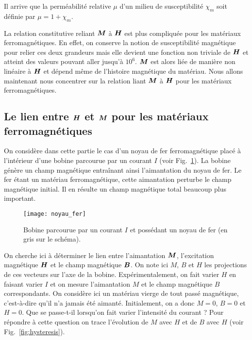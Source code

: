 \begin{rema}
	Il arrive que la perméabilité relative $\mu$ d'un milieu de susceptibilité
	$\chi_m$ soit définie par 
	$\mu = 1 + \chi_m$.
\end{rema}

La relation constitutive reliant $\vecM$ à $\vecH$ est plus compliquée pour les
matériaux ferromagnétiques. En effet, on conserve la notion de susceptibilité
magnétique pour relier ces deux grandeurs mais elle devient
une fonction non triviale de $\vecH$ et atteint des valeurs pouvant aller
jusqu'à $10^6$. $\vecM$ est alors liée de manière 
non linéaire à $\vecH$ et dépend même de l'histoire magnétique
du matériau. Nous allons maintenant nous concentrer sur la relation liant 
$\vecM$ à $\vecH$ pour les matériaux ferromagnétiques.

\subsection{Le lien entre $\vecH$ et $\vecM$ pour les matériaux 
ferromagnétiques}
On considère dans cette partie le cas d'un noyau de fer ferromagnétique placé à l'intérieur 
d'une bobine parcourue par un courant $I$ (voir Fig.~\ref{fig:noyau_fer}). 
La bobine génère un champ magnétique
entraînant ainsi l'aimantation du noyau de fer. Le fer étant un matériau ferromagnétique,
cette aimantation perturbe
le champ magnétique initial. Il en résulte un champ magnétique total 
beaucoup plus important.

\begin{figure}[htpb]
	\centering
	\texttt{[image: noyau\_fer]}
	\caption{Bobine parcourue par un courant $I$ et possédant un noyau de
	fer (en gris sur le schéma).}%
	\label{fig:noyau_fer}
\end{figure}

On cherche ici à déterminer le lien entre l'aimantation $\vecM$, l'excitation
magnétique $\vecH$ et le champ magnétique $\vecb$. 
On note ici $M$, $B$ et $H$ les projections de ces vecteurs sur l'axe de la bobine. 
Expérimentalement,
on fait varier $H$ en faisant varier $I$ et on mesure l'aimantation $M$ et 
le champ magnétique $B$ correspondants. On considère ici un matériau vierge de
tout passé magnétique, c'est-à-dire qu'il n'a jamais été aimanté. Initialement,
on a donc $M=0$, $B=0$ et $H=0$. Que se passe-t-il lorsqu'on fait varier l'intensité
du courant ? Pour répondre à cette question on trace l'évolution de $M$ avec
$H$ et de $B$ avec $H$ (voir Fig.~\ref{fig:hysteresis}).

